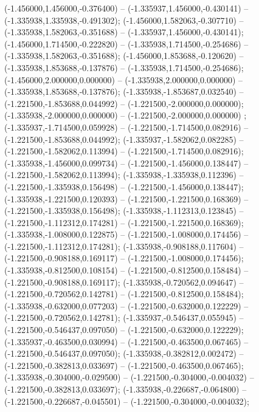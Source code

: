  (-1.456000,1.456000,-0.376400) -- (-1.335937,1.456000,-0.430141) -- (-1.335938,1.335938,-0.491302);
 (-1.456000,1.582063,-0.307710) -- (-1.335938,1.582063,-0.351688) -- (-1.335937,1.456000,-0.430141);
 (-1.456000,1.714500,-0.222820) -- (-1.335938,1.714500,-0.254686) -- (-1.335938,1.582063,-0.351688);
 (-1.456000,1.853688,-0.120620) -- (-1.335938,1.853688,-0.137876) -- (-1.335938,1.714500,-0.254686);
 (-1.456000,2.000000,0.000000) -- (-1.335938,2.000000,0.000000) -- (-1.335938,1.853688,-0.137876);
 (-1.335938,-1.853687,0.032540) -- (-1.221500,-1.853688,0.044992) -- (-1.221500,-2.000000,0.000000);
 (-1.335938,-2.000000,0.000000) -- (-1.221500,-2.000000,0.000000) ;
 (-1.335937,-1.714500,0.059928) -- (-1.221500,-1.714500,0.082916) -- (-1.221500,-1.853688,0.044992);
 (-1.335937,-1.582062,0.082285) -- (-1.221500,-1.582062,0.113994) -- (-1.221500,-1.714500,0.082916);
 (-1.335938,-1.456000,0.099734) -- (-1.221500,-1.456000,0.138447) -- (-1.221500,-1.582062,0.113994);
 (-1.335938,-1.335938,0.112396) -- (-1.221500,-1.335938,0.156498) -- (-1.221500,-1.456000,0.138447);
 (-1.335938,-1.221500,0.120393) -- (-1.221500,-1.221500,0.168369) -- (-1.221500,-1.335938,0.156498);
 (-1.335938,-1.112313,0.123845) -- (-1.221500,-1.112312,0.174281) -- (-1.221500,-1.221500,0.168369);
 (-1.335938,-1.008000,0.122875) -- (-1.221500,-1.008000,0.174456) -- (-1.221500,-1.112312,0.174281);
 (-1.335938,-0.908188,0.117604) -- (-1.221500,-0.908188,0.169117) -- (-1.221500,-1.008000,0.174456);
 (-1.335938,-0.812500,0.108154) -- (-1.221500,-0.812500,0.158484) -- (-1.221500,-0.908188,0.169117);
 (-1.335938,-0.720562,0.094647) -- (-1.221500,-0.720562,0.142781) -- (-1.221500,-0.812500,0.158484);
 (-1.335938,-0.632000,0.077203) -- (-1.221500,-0.632000,0.122229) -- (-1.221500,-0.720562,0.142781);
 (-1.335937,-0.546437,0.055945) -- (-1.221500,-0.546437,0.097050) -- (-1.221500,-0.632000,0.122229);
 (-1.335937,-0.463500,0.030994) -- (-1.221500,-0.463500,0.067465) -- (-1.221500,-0.546437,0.097050);
 (-1.335938,-0.382812,0.002472) -- (-1.221500,-0.382813,0.033697) -- (-1.221500,-0.463500,0.067465);
 (-1.335938,-0.304000,-0.029500) -- (-1.221500,-0.304000,-0.004032) -- (-1.221500,-0.382813,0.033697);
 (-1.335938,-0.226687,-0.064800) -- (-1.221500,-0.226687,-0.045501) -- (-1.221500,-0.304000,-0.004032);
